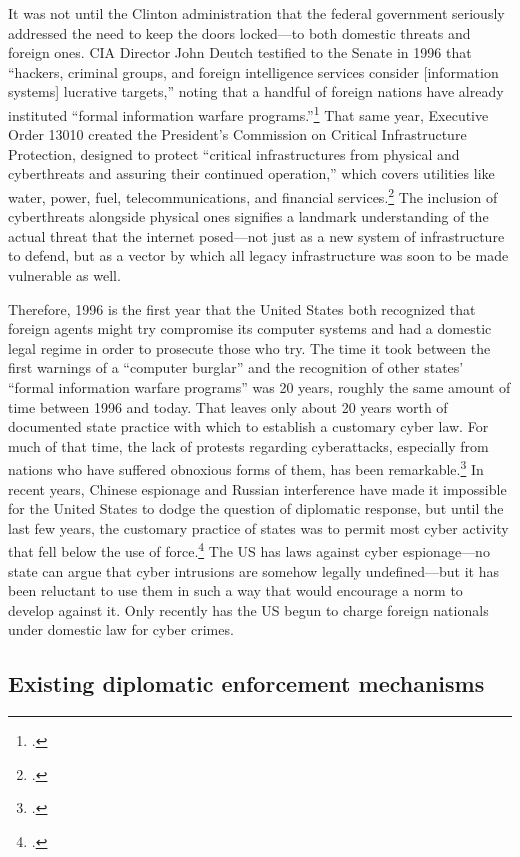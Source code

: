 \documentclass{memoir}
\begin{document}
\begin{refsegment}
It was not until the Clinton administration that the federal government seriously addressed the need to keep the doors locked---to both domestic threats and foreign ones. CIA Director John Deutch testified to the Senate in 1996 that ``hackers, criminal groups, and foreign intelligence services consider [information systems] lucrative targets,'' noting that a handful of foreign nations have already instituted ``formal information warfare programs.''\footcite{deutch_worldwide_1996} That same year, Executive Order 13010 created the President's Commission on Critical Infrastructure Protection, designed to protect ``critical infrastructures from physical and cyberthreats and assuring their continued operation,'' which covers utilities like water, power, fuel, telecommunications, and financial services.\footcite[~p.761]{boys_clinton_2018} The inclusion of cyberthreats alongside physical ones signifies a landmark understanding of the actual threat that the internet posed---not just as a new system of infrastructure to defend, but as a vector by which all legacy infrastructure was soon to be made vulnerable as well.

Therefore, 1996 is the first year that the United States both recognized that foreign agents might try compromise its computer systems and had a domestic legal regime in order to prosecute those who try. The time it took between the first warnings of a ``computer burglar'' and the recognition of other states' ``formal information warfare programs'' was 20 years, roughly the same amount of time between 1996 and today. That leaves only about 20 years worth of documented state practice with which to establish a customary cyber law. For much of that time, the lack of protests regarding cyberattacks, especially from nations who have suffered obnoxious forms of them, has been remarkable.\footcite[p.~132]{brown_customary_2012} In recent years, Chinese espionage and Russian interference have made it impossible for the United States to dodge the question of diplomatic response, but until the last few years, the customary practice of states was to permit most cyber activity that fell below the use of force.\footcite[p.~141]{brown_customary_2012} The US has laws against cyber espionage---no state can argue that cyber intrusions are somehow legally undefined---but it has been reluctant to use them in such a way that would encourage a norm to develop against it. Only recently has the US begun to charge foreign nationals under domestic law for cyber crimes.

\subsection{Existing diplomatic enforcement mechanisms}


\end{refsegment}
\end{document}

